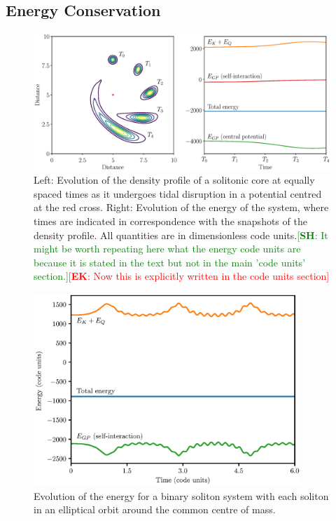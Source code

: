 \documentclass[a4paper,11pt]{article}
\newcommand{\ek}[1]{\textcolor{red}{[{\bf EK}: #1]}}
\newcommand{\sh}[1]{\textcolor{green}{[{\bf SH}: #1]}}
\begin{document}
\subsection{Energy Conservation}\label{sec:energy}

\begin{figure}
  \includegraphics[width=1.1\textwidth,trim=2.5cm 0 0 1cm,clip]{combined_energy_and_density1}
  \caption{Left: Evolution of the density profile of a solitonic core at equally spaced times as it undergoes tidal disruption in a potential centred at the red cross. Right: Evolution of the energy of the system, where times are indicated in correspondence with the snapshots of the density profile. All quantities are in dimensionless code units.\sh{It might be worth repeating here what the energy code units are because it is stated in the text but not in the main 'code units' section.}\ek{Now this is explicitly written in the code units section}}
  \label{fig:combined_1}
\end{figure}

\begin{figure}
  \includegraphics[width=0.9\textwidth,trim=0 0 2cm 2cm,clip]{egy_m=22.eps}
  \caption{Evolution of the energy for a binary soliton system with each soliton in an elliptical orbit around the common centre of mass.}
  \label{fig:binary}
\end{figure}
\end{document}
